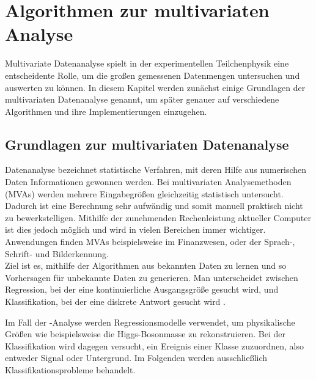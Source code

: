\chapter{Algorithmen zur multivariaten Analyse}
\label{ch:algorithmen}

{}

Multivariate Datenanalyse spielt in der experimentellen Teilchenphysik eine entscheidente Rolle, um die gro\ss en gemessenen Datenmengen untersuchen und auswerten zu k\"onnen. In diesem Kapitel werden zun\"achst einige Grundlagen der multivariaten Datenanalyse genannt, um sp\"ater genauer auf verschiedene Algorithmen und ihre Implementierungen einzugehen.

\section{Grundlagen zur multivariaten Datenanalyse}
\label{ch:Theorie:sec:Algorithmen}

Datenanalyse bezeichnet statistische Verfahren, mit deren Hilfe aus numerischen Daten Informationen gewonnen werden.
Bei multivariaten Analysemethoden (MVAs) werden mehrere Eingabegr\"o\ss en gleichzeitig statistisch untersucht. Dadurch ist eine Berechnung sehr aufw\"andig und somit manuell praktisch nicht zu bewerkstelligen. Mithilfe der zunehmenden Rechenleistung aktueller Computer ist dies jedoch m\"oglich und wird in vielen Bereichen immer wichtiger. Anwendungen finden MVAs beispielsweise im Finanzwesen, oder der Sprach-, Schrift- und Bilderkennung.\\
Ziel ist es, mithilfe der Algorithmen aus bekannten Daten zu lernen und so Vorhersagen f\"ur unbekannte Daten zu generieren.
Man unterscheidet zwischen Regression, bei der eine kontinuierliche Ausgangsgr\"o\ss e gesucht wird, und Klassifikation, bei der eine diskrete Antwort gesucht wird \cite{SWB-455193959}.

Im Fall der \ttH-Analyse werden Regressionsmodelle verwendet, um physikalische Gr\"o\ss en wie beispielsweise die Higgs-Bosonmasse zu rekonstruieren. Bei der Klassifikation wird dagegen versucht, ein Ereignis einer Klasse zuzuordnen, also entweder Signal oder Untergrund. Im Folgenden werden ausschlie\ss lich Klassifikationsprobleme behandelt.

